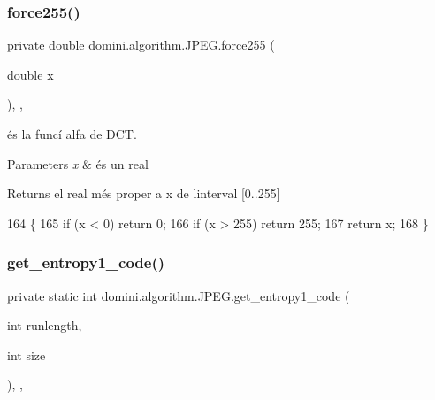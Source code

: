 \subsubsection{\texorpdfstring{force255()}{force255()}}
{\footnotesize\ttfamily private double domini.\+algorithm.\+J\+P\+E\+G.\+force255 (\begin{DoxyParamCaption}\item[{double}]{x }\end{DoxyParamCaption})\hspace{0.3cm}{\ttfamily [inline]}, {\ttfamily [static]}, {\ttfamily [private]}}



és la funcí alfa de D\+CT. 


\begin{DoxyParams}{Parameters}
{\em x} & és un real \\
\hline
\end{DoxyParams}
\begin{DoxyReturn}{Returns}
el real més proper a x de l\textquotesingle{}interval \mbox{[}0..255\mbox{]} 
\end{DoxyReturn}

\begin{DoxyCode}
164                                              \{
165         \textcolor{keywordflow}{if} (x < 0) \textcolor{keywordflow}{return} 0;
166         \textcolor{keywordflow}{if} (x > 255) \textcolor{keywordflow}{return} 255;
167         \textcolor{keywordflow}{return} x;
168     \}
\end{DoxyCode}
\mbox{\label{classdomini_1_1algorithm_1_1JPEG_a0f897c6c525d81551539df1eb8db7e12}} 
\subsubsection{\texorpdfstring{get\+\_\+entropy1\+\_\+code()}{get\_entropy1\_code()}}
{\footnotesize\ttfamily private static int domini.\+algorithm.\+J\+P\+E\+G.\+get\+\_\+entropy1\+\_\+code (\begin{DoxyParamCaption}\item[{int}]{runlength,  }\item[{int}]{size }\end{DoxyParamCaption})\hspace{0.3cm}{\ttfamily [inline]}, {\ttfamily [static]}, {\ttfamily [private]}}



